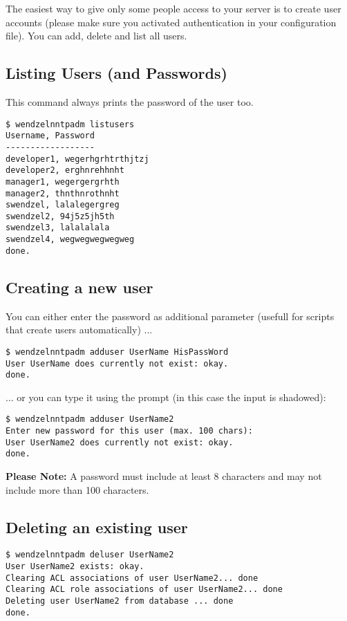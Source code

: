The easiest way to give only some people access to your server is to create user accounts (please make sure you activated authentication in your configuration file). You can add, delete and list all users.

\subsection{Listing Users (and Passwords)}

This command always prints the password of the user too.

\begin{verbatim}
$ wendzelnntpadm listusers
Username, Password
------------------
developer1, wegerhgrhtrthjtzj
developer2, erghnrehhnht
manager1, wegergergrhth
manager2, thnthnrothnht
swendzel, lalalegergreg
swendzel2, 94j5z5jh5th
swendzel3, lalalalala
swendzel4, wegwegwegwegweg
done.
\end{verbatim}

\subsection{Creating a new user}

You can either enter the password as additional parameter (usefull for scripts that create users automatically) ...

\begin{verbatim}
$ wendzelnntpadm adduser UserName HisPassWord
User UserName does currently not exist: okay.
done.
\end{verbatim}

... or you can type it using the prompt (in this case the input is shadowed):

\begin{verbatim}
$ wendzelnntpadm adduser UserName2
Enter new password for this user (max. 100 chars):
User UserName2 does currently not exist: okay.
done.
\end{verbatim}

{\bf Please Note:} A password must include at least 8 characters and may not include more than 100 characters.

\subsection{Deleting an existing user}

\begin{verbatim}
$ wendzelnntpadm deluser UserName2
User UserName2 exists: okay.
Clearing ACL associations of user UserName2... done
Clearing ACL role associations of user UserName2... done
Deleting user UserName2 from database ... done
done.
\end{verbatim}

